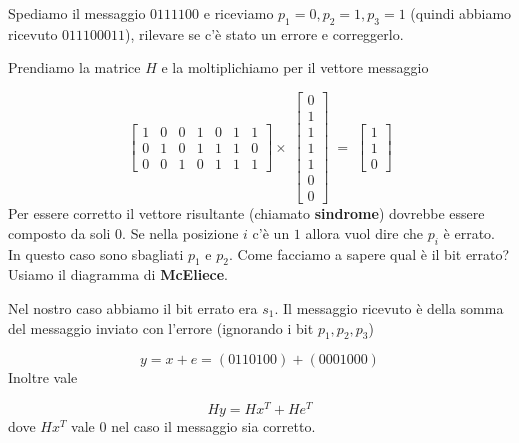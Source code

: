 \documentclass[12pt]{report}
\begin{document}
    \begin{exmp}
        Spediamo il messaggio $0111100$ e riceviamo $p_1 = 0, p_2 = 1, p_3 = 1$ (quindi abbiamo ricevuto $011100011$), rilevare se c'è stato un errore e correggerlo.

        \noindent
        Prendiamo la matrice $H$ e la moltiplichiamo per il vettore messaggio


        \[
            \begin{bmatrix}
                1 & 0 & 0 & 1 & 0 & 1 & 1\\
                0 & 1 & 0 & 1 & 1 & 1 & 0\\
                0 & 0 & 1 & 0 & 1 & 1 & 1
            \end{bmatrix}
            \times
            \; \begin{bmatrix}
                   0 \\
                   1 \\
                   1 \\
                   1 \\
                   1 \\
                   0 \\
                   0
            \end{bmatrix} \; = \; \begin{bmatrix}
                                      1 \\
                                      1 \\
                                      0
            \end{bmatrix} \]
        Per essere corretto il vettore risultante (chiamato \textbf{sindrome}) dovrebbe essere composto da soli $0$. Se nella posizione $i$ c'è un $1$ allora vuol dire che $p_i$ è errato. In questo caso sono sbagliati $p_1$ e $p_2$. Come facciamo a sapere qual è il bit errato? Usiamo il diagramma di \textbf{McEliece}.

        \begin{center}

        \end{center}

        \noindent
        Nel nostro caso abbiamo il bit errato era $s_1$.
        Il messaggio ricevuto è della somma del messaggio inviato con l'errore (ignorando i bit $p_1,p_2,p_3$)

        $$y = x + e = (0110100) + (0001000)$$
        Inoltre vale

        $$H y = H x^T + H e^T$$
        dove $H x^T$ vale $0$ nel caso il messaggio sia corretto.
    \end{exmp}
\end{document}
